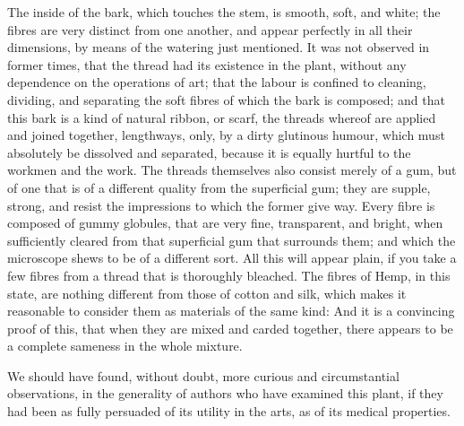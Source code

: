 \documentclass[a4paper, 11pt, oneside, polutonikogreek, english]{article}
\begin{document}
The inside of the bark, which touches the stem, is smooth, soft, and white; the fibres are very distinct from one another, and appear perfectly in all their dimensions, by means of the watering just mentioned. It was not observed in former times, that the thread had its existence in the plant, without any dependence on the operations of art; that the labour is confined to cleaning, dividing, and separating the soft fibres of which the bark is composed; and that this bark is a kind of natural ribbon, or scarf, the threads whereof are applied and joined together, lengthways, only, by a dirty glutinous humour, which must absolutely be dissolved and separated, because it is equally hurtful to the workmen and the work. The threads themselves also consist merely of a gum, but of one that is of a different quality from the superficial gum; they are supple, strong, and resist the impressions to which the former give way. Every fibre is composed of gummy globules, that are very fine, transparent, and bright, when sufficiently cleared from that superficial gum that surrounds them; and which the microscope shews to be of a different sort. All this will appear plain, if you take a few fibres from a thread that is thoroughly bleached. The fibres of Hemp, in this state, are nothing different from those of cotton and silk, which makes it reasonable to consider them as materials of the same kind: And it is a convincing proof of this, that when they are mixed and carded together, there appears to be a complete sameness in the whole mixture.

We should have found, without doubt, more curious and circumstantial observations, in the generality of authors who have examined this plant, if they had been as fully persuaded of its utility in the arts, as of its medical properties.
\end{document}

